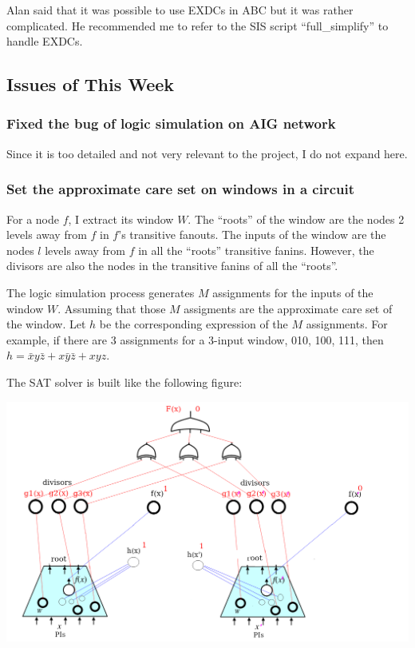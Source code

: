 \documentclass{rpt}
\begin{document}
Alan said that it was possible to use EXDCs in ABC but it was rather complicated.
He recommended me to refer to the SIS script ``full\_simplify'' to handle EXDCs.

\subsection{Issues of This Week}

\subsubsection*{Fixed the bug of logic simulation on AIG network}
Since it is too detailed and not very relevant to the project,
I do not expand here.

\subsubsection*{Set the approximate care set on windows in a circuit}
For a node $f$,
I extract its window $W$.
The ``roots'' of the window are the nodes 2 levels away from $f$ in $f$'s transitive fanouts.
The inputs of the window are the nodes $l$ levels away from $f$ in all the ``roots'' transitive fanins.
However,
the divisors are also the nodes in the transitive fanins of all the ``roots''.

The logic simulation process generates $M$ assignments for the inputs of the window $W$.
Assuming that those $M$ assigments are the approximate care set of the window.
Let $h$ be the corresponding expression of the $M$ assignments.
For example,
if there are 3 assignments for a 3-input window,
010, 100, 111,
then $h=\bar xy \bar z + x \bar y \bar z + xyz$.

The SAT solver is built like the following figure:

\includegraphics[width=7.0in]{./sat.png}
\end{document}
